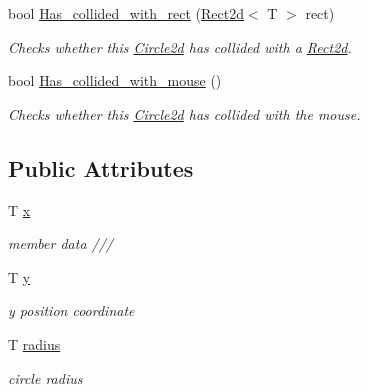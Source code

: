 \begin{DoxyCompactItemize}
bool \hyperlink{classjetfuel_1_1draw_1_1Circle2d_a067f431a70a3df691223b955d4a1d573}{Has\+\_\+collided\+\_\+with\+\_\+rect} (\hyperlink{classjetfuel_1_1draw_1_1Rect2d}{Rect2d}$<$ T $>$ rect)
\begin{DoxyCompactList}\small\item\em Checks whether this \hyperlink{classjetfuel_1_1draw_1_1Circle2d}{Circle2d} has collided with a \hyperlink{classjetfuel_1_1draw_1_1Rect2d}{Rect2d}. \end{DoxyCompactList}\item 
bool \hyperlink{classjetfuel_1_1draw_1_1Circle2d_a51ddff1ce48a2433f108af1268abbcb3}{Has\+\_\+collided\+\_\+with\+\_\+mouse} ()
\begin{DoxyCompactList}\small\item\em Checks whether this \hyperlink{classjetfuel_1_1draw_1_1Circle2d}{Circle2d} has collided with the mouse. \end{DoxyCompactList}\end{DoxyCompactItemize}
\subsection*{Public Attributes}
\begin{DoxyCompactItemize}
\item 
T \hyperlink{classjetfuel_1_1draw_1_1Circle2d_a9aa0ccc7733d735950352373e2a72352}{x}
\begin{DoxyCompactList}\small\item\em member data /// \end{DoxyCompactList}\item 
\mbox{\label{classjetfuel_1_1draw_1_1Circle2d_a720dee1fceb981cf5245bc82c2d5f8e1}} 
T \hyperlink{classjetfuel_1_1draw_1_1Circle2d_a720dee1fceb981cf5245bc82c2d5f8e1}{y}
\begin{DoxyCompactList}\small\item\em y position coordinate \end{DoxyCompactList}\item 
\mbox{\label{classjetfuel_1_1draw_1_1Circle2d_ae5e10da97d4a857a6c14179f81bed159}} 
T \hyperlink{classjetfuel_1_1draw_1_1Circle2d_ae5e10da97d4a857a6c14179f81bed159}{radius}
\begin{DoxyCompactList}\small\item\em circle radius \end{DoxyCompactList}\end{DoxyCompactItemize}


